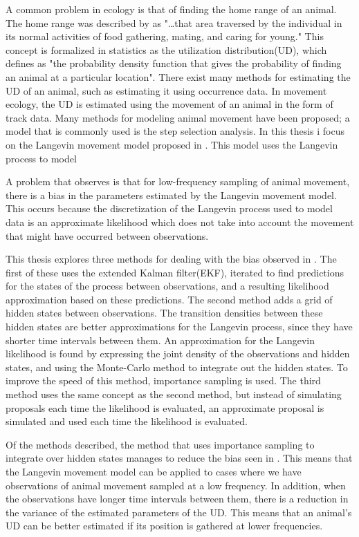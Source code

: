 
A common problem in ecology is that of finding the home range of an animal. The home range was described by \parencite{burt1943territoriality} as "\dots that area traversed by the individual in its normal activities of food gathering, mating, and caring for young." This concept is formalized in statistics as the utilization distribution(UD), which \parencite{anderson1982home} defines as "the probability density function that gives the probability of finding an animal at a particular location". There exist many methods for estimating the UD of an animal, such as estimating it using occurrence data. In movement ecology, the UD is estimated using the movement of an animal in the form of track data. Many methods for modeling animal movement have been proposed; a model that is commonly used is the step selection analysis. In this thesis i focus on the Langevin movement model proposed in \parencite{michelot_langevin_2019}. This model uses the Langevin process to model 


A problem that \parencite{michelot_langevin_2019} observes is that for low-frequency sampling of animal movement, there is a bias in the parameters estimated by the Langevin movement model. This occurs because the discretization of the Langevin process used to model data is an approximate likelihood which does not take into account the movement that might have occurred between observations. 


This thesis explores three methods for dealing with the bias observed in \parencite{michelot_langevin_2019}. The first of these uses the extended Kalman filter(EKF), iterated to find predictions for the states of the process between observations, and a resulting likelihood approximation based on these predictions. The second method adds a grid of hidden states between observations. The transition densities between these hidden states are better approximations for the Langevin process, since they have shorter time intervals between them. An approximation for the Langevin likelihood is found by expressing the joint density of the observations and hidden states, and using the Monte-Carlo method to integrate out the hidden states. To improve the speed of this method, importance sampling is used. The third method uses the same concept as the second method, but instead of simulating proposals each time the likelihood is evaluated, an approximate proposal is simulated and used each time the likelihood is evaluated. 


Of the methods described, the method that uses importance sampling to integrate over hidden states manages to reduce the bias seen in \parencite{michelot_langevin_2019}. This means that the Langevin movement model can be applied to cases where we have observations of animal movement sampled at a low frequency. In addition, when the observations have longer time intervals between them, there is a reduction in the variance of the estimated parameters of the UD. This means that an animal's UD can be better estimated if its position is gathered at lower frequencies.










